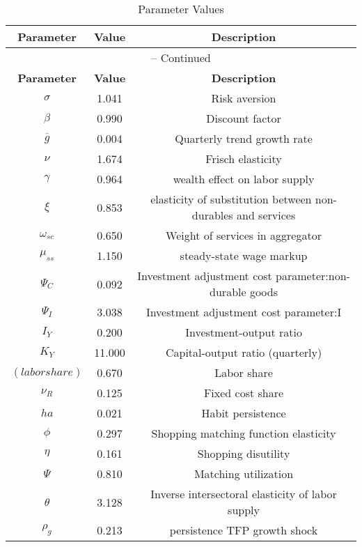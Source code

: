 \begin{center}
\begin{longtable}{ccc}
\caption{Parameter Values}\\%
\toprule%
\multicolumn{1}{c}{\textbf{Parameter}} &
\multicolumn{1}{c}{\textbf{Value}} &
 \multicolumn{1}{c}{\textbf{Description}}\\%
\midrule%
\endfirsthead
\multicolumn{3}{c}{{\tablename} \thetable{} -- Continued}\\%
\midrule%
\multicolumn{1}{c}{\textbf{Parameter}} &
\multicolumn{1}{c}{\textbf{Value}} &
  \multicolumn{1}{c}{\textbf{Description}}\\%
\midrule%
\endhead
${\sigma}$ 	 & 	 1.041 	 & 	 Risk aversion\\
${\beta}$ 	 & 	 0.990 	 & 	 Discount factor\\
${\overline{g}}$ 	 & 	 0.004 	 & 	 Quarterly trend growth rate\\
$\nu$ 	 & 	 1.674 	 & 	 Frisch elasticity\\
$\gamma$ 	 & 	 0.964 	 & 	 wealth effect on labor supply\\
$\xi$ 	 & 	 0.853 	 & 	 elasticity of substitution between non-durables and services\\
$\omega_{sc}$ 	 & 	 0.650 	 & 	 Weight of services in aggregator\\
$\mu_{ss}$ 	 & 	 1.150 	 & 	 steady-state wage markup\\
${\Psi_{C}}$ 	 & 	 0.092 	 & 	 Investment adjustment cost parameter:non-durable goods\\
${\Psi_I}$ 	 & 	 3.038 	 & 	 Investment adjustment cost parameter:I\\
${I_Y}$ 	 & 	 0.200 	 & 	 Investment-output ratio\\
${K_Y}$ 	 & 	 11.000 	 & 	 Capital-output ratio (quarterly)\\
$(labor share)$ 	 & 	 0.670 	 & 	 Labor share\\
${\nu_R}$ 	 & 	 0.125 	 & 	 Fixed cost share\\
${ha}$ 	 & 	 0.021 	 & 	 Habit persistence\\
${\phi}$ 	 & 	 0.297 	 & 	 Shopping matching function elasticity\\
${\eta}$ 	 & 	 0.161 	 & 	 Shopping disutility\\
${\Psi}$ 	 & 	 0.810 	 & 	 Matching utilization\\
${\theta}$ 	 & 	 3.128 	 & 	 Inverse intersectoral elasticity of labor supply\\
${\rho_g}$ 	 & 	 0.213 	 & 	 persistence TFP growth shock\\

\end{longtable}
\end{center}
